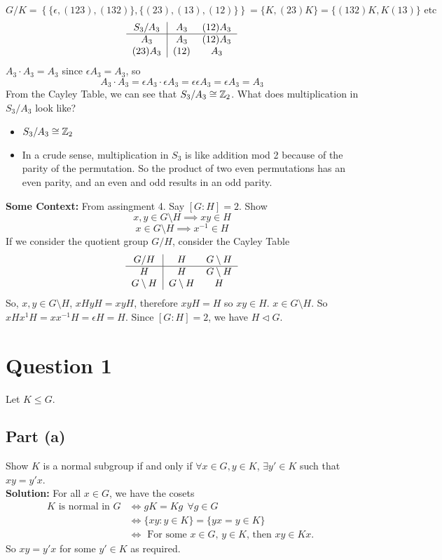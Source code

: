 \documentclass[openany]{report}
\begin{document}
\[G/K = \left\{ \{\epsilon, (123), (132)\}, \{(23),(13),(12)\} \right\} = \{K, (23)K\} = \{(132)K, K(13)\} \text{ etc}\]
\[
\begin{tabular}{c|cc}
    $S_3/A_3$ & $A_3$ & $(12)A_3$\\
    \hline
   $ A_3$ &$ A_3 $& $(12)A_3$\\
    $(23)A_3$ & $(12)$ &$ A_3$
\end{tabular}    
\]
$A_3 \cdot A_3 = A_3$ since $\epsilon A_3 = A_3$, so
\[A_3 \cdot A_3 = \epsilon A_3 \cdot \epsilon A_3 = \epsilon\epsilon A_3 = \epsilon A_3 = A_3\]
From the Cayley Table, we can see that $S_3/A_3 \cong \mathbb{Z}_2$. What does multiplication in $S_3/A_3$ look like? 
\begin{itemize}
    \item $S_3/A_3 \cong \mathbb{Z}_2$
    \item In a crude sense, multiplication in $S_3$ is like addition mod 2 because of the parity of the permutation. So the product of two even permutations has an even parity, and an even and odd results in an odd parity.
\end{itemize}
\textbf{Some Context:} From assingment 4. Say $[G:H] = 2$. Show 
\[x,y \in G \setminus H \implies xy \in H\] 
\[x \in G \setminus H \implies x^{-1} \in H\]
If we consider the quotient group $G/H$, consider the Cayley Table
\[
\begin{tabular}{c|cc}
    $G/H$ & $H$ & $G \setminus H$\\
    \hline
    $H$ & $H$ & $G \setminus H$\\
    $G \setminus H$ & $G \setminus H$ &$H$ \\
\end{tabular}
\] 
So, $x, y \in G \setminus H$, $xHyH = xyH$, therefore $xyH = H$ so $xy \in H$. $x \in G \setminus H$. So $x H x^{1}H = x x^{-1}H = \epsilon H = H$. Since $[G : H] = 2$, we have $H \triangleleft G$.
\section{Question 1}
Let $K \leq G$. 
\subsection{Part (a)}
Show $K$ is a normal subgroup if and only if $\forall x \in G, y\in K$, $\exists y' \in K$ such that $xy =y'x$. \\[2ex]
\textbf{Solution:}
For all $x \in G$, we have the cosets
\begin{align*}
    K \text{ is normal in $G$} &\iff gK = Kg \ \ \forall g \in G\\
    &\iff \{xy :  y \in K\} = \{yx = y \in K\}\\
    &\iff \text{ For some $x \in G$, $y\in K$, then $xy \in Kx$. }
\end{align*}
So $xy = y'x$ for some $y' \in K$ as required.
\end{document}
